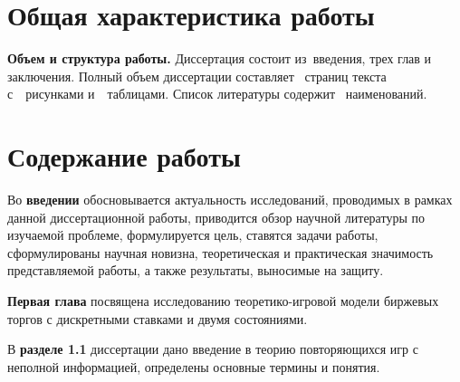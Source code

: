 
\section*{Общая характеристика работы}

\newcommand{\emphasis}[1]{\textbf{{#1}}}
\newcommand{\actuality}{\emphasis{\actualityTXT}}
\newcommand{\progress}{\emphasis{\progressTXT}}
\newcommand{\aim}{\emphasis{\aimTXT}}
\newcommand{\tasks}{\emphasis{\tasksTXT}}
\newcommand{\researchsubject}{\emphasis{\researchsubjectTXT}}
\newcommand{\novelty}{\emphasis{\noveltyTXT}}
\newcommand{\influence}{\emphasis{\influenceTXT}}
\newcommand{\methods}{\emphasis{\methodsTXT}}
\newcommand{\defpositions}{\emphasis{\defpositionsTXT}}
\newcommand{\reliability}{\emphasis{\reliabilityTXT}}
\newcommand{\probation}{\emphasis{\probationTXT}}
\newcommand{\contribution}{\emphasis{\contributionTXT}}
\newcommand{\publications}{\emphasis{\publicationsTXT}}



\emphasis{Объем и структура работы.}
Диссертация состоит из~введения, трех глав и заключения.
Полный объем диссертации составляет ~страниц текста с~~рисунками и~~таблицами.
Список литературы содержит ~наименований.

\section*{Содержание работы}
Во \emphasis{введении} обосновывается актуальность исследований, проводимых в рамках данной диссертационной работы, приводится обзор научной литературы по изучаемой проблеме, формулируется цель, ставятся задачи работы, сформулированы научная новизна, теоретическая и практическая значимость представляемой работы, а также результаты, выносимые на защиту.

\emphasis{Первая глава} посвящена исследованию теоретико-игровой модели биржевых торгов с дискретными ставками и двумя состояниями.

В \emphasis{разделе 1.1} диссертации дано введение в теорию повторяющихся игр с неполной информацией, определены основные термины и понятия.

